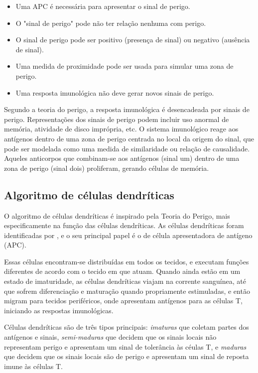 \begin{itemize}
    \item Uma APC é necessária para apresentar o sinal de perigo.
    \item O "sinal de perigo" pode não ter relação nenhuma com perigo.
    \item O sinal de perigo pode ser positivo (presença de sinal) ou negativo (ausência de sinal).
    \item Uma medida de proximidade pode ser usada para simular uma zona de perigo.
    \item Uma resposta imunológica não deve gerar novos sinais de perigo.
\end{itemize}

Segundo a teoria do perigo, a resposta imunológica é desencadeada por sinais de perigo. Representações dos sinais de perigo podem incluir uso anormal de memória, atividade de disco imprópria, etc. O sistema imunológico reage aos antígenos dentro de uma zona de perigo centrada no local da origem do sinal, que pode ser modelada como uma medida de similaridade ou relação de causalidade. Aqueles anticorpos que combinam-se aos antígenos (sinal um) dentro de uma zona de perigo (sinal dois) proliferam, gerando células de memória.

\subsection{Algoritmo de células dendríticas}

O algoritmo de células dendríticas é inspirado pela Teoria do Perigo, mais especificamente na função das células dendríticas. As células dendríticas foram identificadas por \cite{Steinman1973}, e o seu principal papel é o de célula apresentadora de antígeno (APC).

Essas células encontram-se distribuídas em todos os tecidos, e executam funções diferentes de acordo com o tecido em que atuam. Quando ainda estão em um estado de imaturidade, as células dendríticas viajam na corrente sanguínea, até que sofrem diferenciação e maturação quando propriamente estimuladas, e então migram para tecidos periféricos, onde apresentam antígenos para as células T, iniciando as respostas imunológicas.

Células dendríticas são de três tipos principais: \emph{imaturas} que coletam partes dos antígenos e sinais, \emph{semi-maduras} que decidem que os sinais locais não representam perigo e apresentam um sinal de tolerância às céulas T, e \emph{maduras} que decidem que os sinais locais são de perigo e apresentam um sinal de reposta imune às células T.


